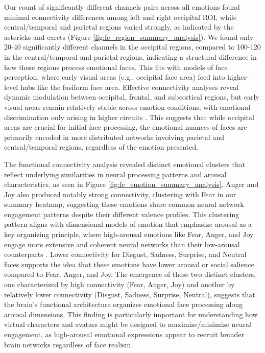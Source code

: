 Our count of significantly different channels pairs across all emotions found minimal connectivity differences among left and right occipital ROI, while central/temporal and parietal regions varied strongly, as indicated by the astericks and carets (Figure \ref{fig:fc_region_summary_analysis}).
We found only 20-40 significantly different channels in the occipital regions, compared to 100-120 in the central/temporal and parietal regions, indicating a structural difference in how these regions process emotional faces.
This fits with models of face perception, where early visual areas (e.g., occipital face area) feed into higher-level hubs like the fusiform face area. 
Effective connectivity analyses reveal dynamic modulation between occipital, frontal, and subcortical regions, but early visual areas remain relatively stable across emotion conditions, with emotional discrimination only arising in higher circuits \citep{underwood_networks_2021}. 
This suggests that while occipital areas are crucial for initial face processing, the emotional nuances of faces are primarily encoded in more distributed networks involving parietal and central/temporal regions, regardless of the emotion presented.

The functional connectivity analysis revealed distinct emotional clusters that reflect underlying similarities in neural processing patterns and arousal characteristics, as seen in Figure \ref{fig:fc_emotion_summary_analysis}.
Anger and Joy also produced notably strong connectivity, clustering with Fear in our summary heatmap, suggesting these emotions share common neural network engagement patterns despite their different valence profiles.
This clustering pattern aligns with dimensional models of emotion that emphasize arousal as a key organizing principle, where high-arousal emotions like Fear, Anger, and Joy engage more extensive and coherent neural networks than their low-arousal counterparts \citep{ke_dynamic_2025}.
Lower connectivity for Disgust, Sadness, Surprise, and Neutral faces supports the idea that these emotions have lower arousal or social salience compared to Fear, Anger, and Joy.
The emergence of these two distinct clusters, one characterized by high connectivity (Fear, Anger, Joy) and another by relatively lower connectivity (Disgust, Sadness, Surprise, Neutral), suggests that the brain's functional architecture organizes emotional face processing along arousal dimensions. 
This finding is particularly important for understanding how virtual characters and avatars might be designed to maximize/minimize neural engagement, as high-arousal emotional expressions appear to recruit broader brain networks regardless of face realism.

